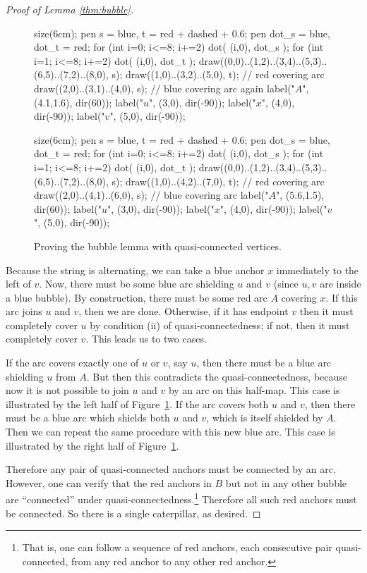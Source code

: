 \begin{proof}[Proof of Lemma \ref{thm:bubble}]
	\begin{figure}[ht]
		\centering
		\begin{asy}
			size(6cm);
			pen s = blue, t = red + dashed + 0.6;
			pen dot_s = blue, dot_t = red;
			for (int i=0; i<=8; i+=2) { dot( (i,0), dot_s ); }
			for (int i=1; i<=8; i+=2) { dot( (i,0), dot_t ); }
			draw((0,0)..(1,2)..(3,4)..(5,3)..(6,5)..(7,2)..(8,0), s);
			draw((1,0)..(3,2)..(5,0), t); // red covering arc
			draw((2,0)..(3,1)..(4,0), s); // blue covering arc again
			label("$A$", (4.1,1.6), dir(60));
			label("$u$", (3,0), dir(-90));
			label("$x$", (4,0), dir(-90));
			label("$v$", (5,0), dir(-90));
		\end{asy}
		\hspace{2em}
		\begin{asy}
			size(6cm);
			pen s = blue, t = red + dashed + 0.6;
			pen dot_s = blue, dot_t = red;
			for (int i=0; i<=8; i+=2) { dot( (i,0), dot_s ); }
			for (int i=1; i<=8; i+=2) { dot( (i,0), dot_t ); }
			draw((0,0)..(1,2)..(3,4)..(5,3)..(6,5)..(7,2)..(8,0), s);
			draw((1,0)..(4,2)..(7,0), t); // red covering arc
			draw((2,0)..(4,1)..(6,0), s); // blue covering arc
			label("$A$", (5.6,1.5), dir(60));
			label("$u$", (3,0), dir(-90));
			label("$x$", (4,0), dir(-90));
			label("$v$", (5,0), dir(-90));
		\end{asy}
		\caption{Proving the bubble lemma with quasi-connected vertices.}
		\label{fig:pf_bubble}
	\end{figure}
	Because the string is alternating, we can take a blue anchor $x$ immediately to the left of $v$.  Now, there must be some blue arc shielding $u$ and $v$ (since $u,v$ are inside a blue bubble).  By construction, there must be some red arc $A$ covering $x$.  If this arc joins $u$ and $v$, then we are done.  
	Otherwise, if it has endpoint $v$ then it must completely cover $u$ by condition (ii) of quasi-connectedness; if not, then it must completely cover $v$.  This leads us to two cases.
	\begin{itemize}
		\ii If the arc covers exactly one of $u$ or $v$, say $u$, then there must be a blue arc shielding $u$ from $A$.  But then this contradicts the quasi-connectedness, because now it is not possible to join $u$ and $v$ by an arc on this half-map.  This case is illustrated by the left half of Figure~\ref{fig:pf_bubble}.
		\ii If the arc covers both $u$ and $v$, then there must be a blue arc which shields both $u$ and $v$, which is itself shielded by $A$.  Then we can repeat the same procedure with this new blue arc.  This case is illustrated by the right half of Figure~\ref{fig:pf_bubble}.
	\end{itemize}
	Therefore any pair of quasi-connected anchors must be connected by an arc.  However, one can verify that the red anchors in $B$ but not in any other bubble are ``connected'' under quasi-connectedness.\footnote{That is, one can follow a sequence of red anchors, each consecutive pair quasi-connected, from any red anchor to any other red anchor.}  Therefore all such red anchors must be connected.  So there is a single caterpillar, as desired.
\end{proof}

